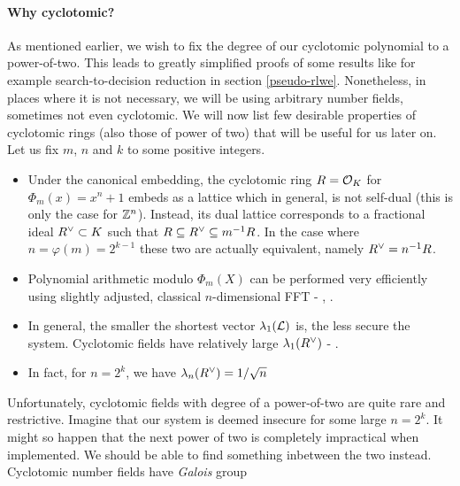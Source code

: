 \paragraph{Why cyclotomic?}\label{why?}
As mentioned earlier, we wish to fix the degree of our cyclotomic polynomial to a power-of-two. This leads to greatly simplified proofs of some results like for example search-to-decision reduction in section \ref{pseudo-rlwe}. Nonetheless, in places where it is not necessary, we will be using arbitrary number fields, sometimes not even cyclotomic. We will now list few desirable properties of cyclotomic rings (also those of power of two) that will be useful for us later on. Let us fix $m$, $n$ and $k$ to some positive integers.
\begin{itemize}
	\item Under the canonical embedding, the cyclotomic ring $R = \mathcal{O}_K$ for $\Phi_m(x) = x^n + 1$ embeds as a lattice which in general, is not self-dual (this is only the case for $\mathbb{Z}^n$). Instead, its dual lattice corresponds to a fractional ideal $R^{\vee} \subset K$ such that $R \subseteq R^{\vee} \subseteq m^{-1}R$. In the case where $n = \varphi(m) =  2^{k-1}$ these two are actually equivalent, namely $R^{\vee} = n^{-1}R$.
	\item Polynomial arithmetic modulo $\Phi_m(X)$ can be performed very efficiently using slightly adjusted, classical $n$-dimensional FFT - \cite{toolkit}, \cite{swift}.
	\item In general, the smaller the shortest vector $\lambda_1(\mathcal{L})$ is, the less secure the system. Cyclotomic fields have relatively large $\lambda_1(R^{\vee})$ - \cite{oracle}.
	\item In fact, for $n = 2^k$, we have $\lambda_n(R^{\vee}) = 1/\sqrt{n}$
		\iffalse
	\item They also have relatively small \textit{expansion factors} (roughly speaking it is the ratio of the size of the public key to the size of the secret key) as defined and explained in \cite{expansion}.
		\fi
\end{itemize}
Unfortunately, cyclotomic fields with degree of a power-of-two are quite rare and restrictive. Imagine that our system is deemed insecure for some large $n = 2^k$. It might so happen that the next power of two is completely impractical when implemented. We should be able to find something inbetween the two instead.
Cyclotomic number fields have \textit{Galois} group
